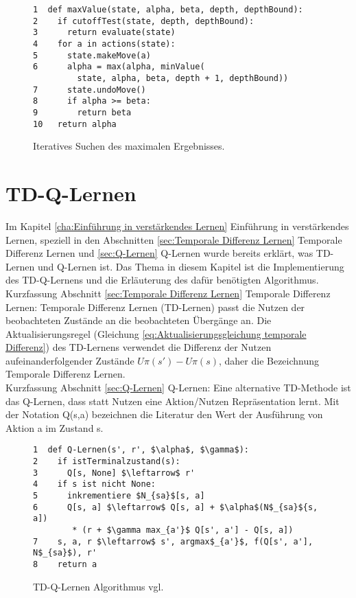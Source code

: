\begin{figure}[!htbp]
\centering
\begin{lstlisting}[frame=single, mathescape=true]
1  def maxValue(state, alpha, beta, depth, depthBound):
2    if cutoffTest(state, depth, depthBound):
3      return evaluate(state)
4    for a in actions(state):
5      state.makeMove(a)
6      alpha = max(alpha, minValue(
         state, alpha, beta, depth + 1, depthBound))
7      state.undoMove()
8      if alpha >= beta:
9        return beta
10   return alpha
\end{lstlisting}
\caption{Iteratives Suchen des maximalen Ergebnisses.}
\label{fig:Iteratives Suchen des maximalen Ergebnisses}
\end{figure} 

\section{TD-Q-Lernen}
Im Kapitel \ref{cha:Einführung in verstärkendes Lernen} Einführung in verstärkendes Lernen, speziell in den Abschnitten \ref{sec:Temporale Differenz Lernen} Temporale Differenz Lernen und \ref{sec:Q-Lernen} Q-Lernen wurde bereits erklärt, was TD-Lernen und Q-Lernen ist. Das Thema in diesem Kapitel ist die Implementierung des TD-Q-Lernens und die Erläuterung des dafür benötigten Algorithmus. \\

Kurzfassung Abschnitt \ref{sec:Temporale Differenz Lernen} Temporale Differenz Lernen: Temporale Differenz Lernen (TD-Lernen) passt die Nutzen der beobachteten Zustände an die beobachteten Übergänge an. Die Aktualisierungsregel (Gleichung \ref{eq:Aktualisierungsgleichung temporale Differenz}) des TD-Lernens verwendet die Differenz der Nutzen aufeinanderfolgender Zustände $U\pi(s') - U\pi(s)$, daher die Bezeichnung Temporale Differenz Lernen. \\

Kurzfassung Abschnitt \ref{sec:Q-Lernen} Q-Lernen: Eine alternative TD-Methode ist das Q-Lernen, dass statt Nutzen eine Aktion/Nutzen Repräsentation lernt. Mit der Notation Q(s,a) bezeichnen die Literatur den Wert der Ausführung von Aktion a im Zustand s. \\

\begin{figure}[!htbp]
\centering
\begin{lstlisting}[frame=single, mathescape=true]
1  def Q-Lernen(s', r', $\alpha$, $\gamma$):
2    if istTerminalzustand(s):
3      Q[s, None] $\leftarrow$ r'
4    if s ist nicht None:
5      inkrementiere $N_{sa}$[s, a]
6      Q[s, a] $\leftarrow$ Q[s, a] + $\alpha$(N$_{sa}${s, a])
  		* (r + $\gamma max_{a'}$ Q[s', a'] - Q[s, a])
7    s, a, r $\leftarrow$ s', argmax$_{a'}$, f(Q[s', a'], N$_{sa}$), r'
8    return a
\end{lstlisting}
\caption{TD-Q-Lernen Algorithmus vgl. \cite[974]{Russell}}
\label{fig:TD-Q-Lernen Algorithmus}
\end{figure} 

